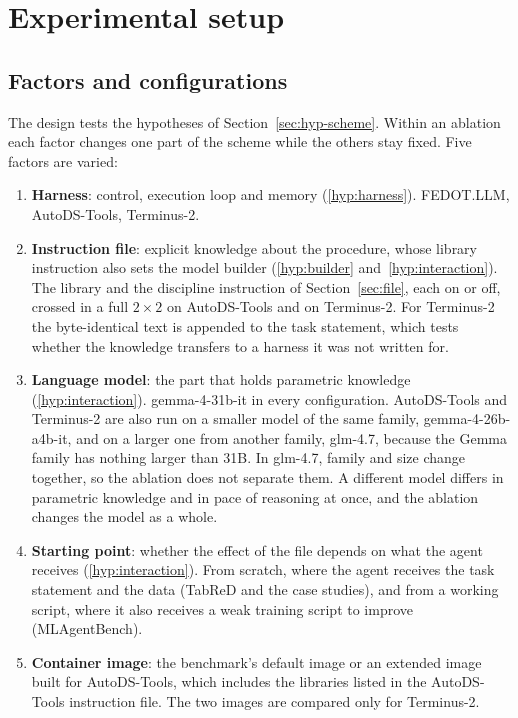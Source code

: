 \section{Experimental setup}
\label{sec:design}


\subsection{Factors and configurations}

The design tests the hypotheses of Section~\ref{sec:hyp-scheme}. Within an
ablation each factor changes one part of the scheme while the others stay
fixed. Five factors are varied:
\begin{enumerate}
    \item \textbf{Harness}: control, execution loop and memory (\ref{hyp:harness}). FEDOT.LLM, AutoDS-Tools, Terminus-2.
    \item \textbf{Instruction file}: explicit knowledge about the procedure, whose library instruction also sets the model builder (\ref{hyp:builder} and~\ref{hyp:interaction}). The library and the discipline instruction of Section~\ref{sec:file}, each on or off, crossed in a full $2\times2$ on AutoDS-Tools and on Terminus-2. For Terminus-2 the byte-identical text is appended to the task statement, which tests whether the knowledge transfers to a harness it was not written for.
    \item \textbf{Language model}: the part that holds parametric knowledge (\ref{hyp:interaction}). gemma-4-31b-it in every configuration. AutoDS-Tools and Terminus-2 are also run on a smaller model of the same family, gemma-4-26b-a4b-it, and on a larger one from another family, glm-4.7, because the Gemma family has nothing larger than 31B. In glm-4.7, family and size change together, so the ablation does not separate them. A different model differs in parametric knowledge and in pace of reasoning at once, and the ablation changes the model as a whole.
    \item \textbf{Starting point}: whether the effect of the file depends on what the agent receives (\ref{hyp:interaction}). From scratch, where the agent receives the task statement and the data (TabReD and the case studies), and from a working script, where it also receives a weak training script to improve (MLAgentBench).
    \item \textbf{Container image}: the benchmark's default image or an extended image built for AutoDS-Tools, which includes the libraries listed in the AutoDS-Tools instruction file. The two images are compared only for Terminus-2.
\end{enumerate}

